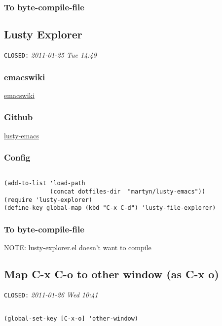 \documentclass[colorlinks=true,urlcolor=blue,listings-sv]{article}
\begin{document}
\subsubsection{To byte-compile-file}
\label{sec-1-40-4}
\subsection{Lusty Explorer}
\label{sec-1-41}

   \texttt{CLOSED:} \textit{2011-01-25 Tue 14:49}
\subsubsection{emacswiki}
\label{sec-1-41-1}


\href{http://www.emacswiki.org/emacs/lusty-explorer.el}{emacswiki}
\subsubsection{Github}
\label{sec-1-41-2}


\href{https://github.com/sjbach/lusty-emacs}{lusty-emacs}
\subsubsection{Config}
\label{sec-1-41-3}



\lstset{language=Lisp}
\begin{lstlisting}

(add-to-list 'load-path
             (concat dotfiles-dir  "martyn/lusty-emacs"))
(require 'lusty-explorer)
(define-key global-map (kbd "C-x C-d") 'lusty-file-explorer)
\end{lstlisting}
\subsubsection{To byte-compile-file}
\label{sec-1-41-4}


NOTE: lusty-explorer.el doesn't want to compile
\subsection{Map C-x C-o to other window (as C-x o)}
\label{sec-1-42}

   \texttt{CLOSED:} \textit{2011-01-26 Wed 10:41}


\lstset{language=Lisp}
\begin{lstlisting}

(global-set-key [C-x-o] 'other-window)
\end{lstlisting}
\end{document}
